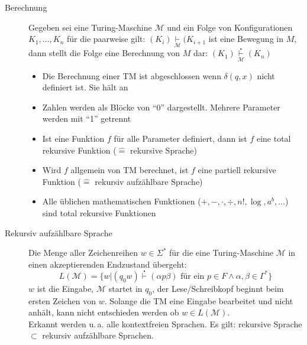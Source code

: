 \begin{description}
	\item[Berechnung]
		Gegeben sei eine Turing-Maschine $\mathcal{M}$ und ein Folge von Konfigurationen $K_1, \dots, K_n$ für die paarweise gilt: $(K_i) \underset{\mathcal{M}}{\vdash} (K_{i+1}$ ist eine Bewegung in $M$, dann stellt die Folge eine Berechnung von $M$ dar: $(K_1) \overset{\centerdot}{\underset{\mathcal{M}}{\vdash}} (K_n)$
		\begin{itemize}\itemsep0em
			\item Die Berechnung einer TM ist abgeschlossen wenn $\delta(q, x)$ nicht definiert ist. Sie hält an
			\item Zahlen werden als Blöcke von \enquote{0} dargestellt. Mehrere Parameter werden mit \enquote{1} getrennt
			\item Ist eine Funktion $f$ für alle Parameter definiert, dann ist $f$ eine total rekursive Funktion ($\widehat{=}$ rekursive Sprache)
			\item Wird $f$ allgemein von TM berechnet, ist $f$ eine partiell rekursive Funktion ($\widehat{=}$ rekursiv aufzählbare Sprache)
			\item Alle üblichen mathematischen Funktionen ($+, -, \cdot, \div, n!, \log, a^b, \dots$) sind total rekursive Funktionen
		\end{itemize}


	\item[Rekursiv aufzählbare Sprache]
	Die Menge aller Zeichenreihen $w \in \Sigma^*$ für die eine Turing-Maschine $\mathcal{M}$ in einen akzeptierenden Endzustand übergeht:
	\begin{equation*}
		L(\mathcal{M}) = \{w | (q_{0}w) \overset{\centerdot}{\vdash} (\alpha p\beta) \mbox{ für ein } p \in F \wedge \alpha, \beta \in \Gamma^*\}
	\end{equation*}
	$w$ ist die Eingabe, $\mathcal{M}$ startet in $q_0$, der Lese/Schreibkopf beginnt beim ersten Zeichen von $w$. Solange die TM eine Eingabe bearbeitet und nicht anhält, kann nicht entschieden werden ob $w \in L(\mathcal{M})$.\\
	Erkannt werden u.\,a. alle kontextfreien Sprachen. Es gilt: rekursive Sprache $\subset$ rekursiv aufzählbare Sprachen.
	
\end{description}

